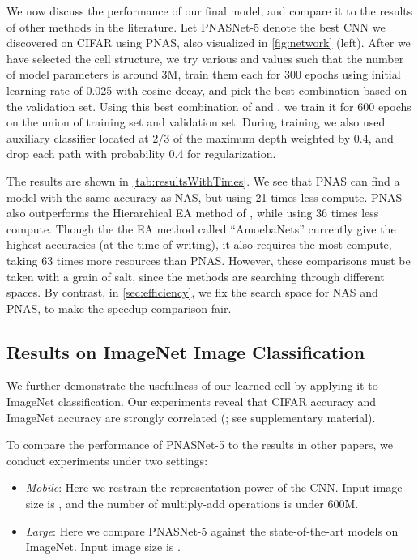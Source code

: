 \documentclass[runningheads]{llncs}
\begin{document}
We now discuss the performance of our final model,
and compare it to the results of other methods in the literature.
Let PNASNet-5 denote the best CNN we discovered on CIFAR using PNAS, also visualized in \cref{fig:network} (left).
After we have selected the cell structure,
we try various  and  values such that the number of model parameters is around 3M,
train them each for 300 epochs using initial learning rate of 0.025 with cosine decay,
and pick the best combination based on the validation set.
Using this best combination of  and , we train it for
600 epochs on the union of training set and validation set.
During training we also used auxiliary classifier located at 2/3 of the maximum depth weighted by 0.4, and drop each path with probability 0.4 for regularization.

The results are shown in \cref{tab:resultsWithTimes}.
We see that PNAS can find a model with the same accuracy as NAS,
but using 21 times less compute.
PNAS also outperforms the Hierarchical EA method of \cite{Liu2017}, while using 36 times less compute.
Though the the EA method called ``AmoebaNets''
\cite{DBLP:journals/corr/abs-1802-01548}
currently give the highest accuracies (at the time of writing),
it also requires the most compute, taking 63 times more resources than PNAS.
However, these comparisons must be taken with a grain of salt, 
since the methods are searching through different spaces.
By contrast, in \cref{sec:efficiency}, we fix the search space for NAS and PNAS,
to make the speedup comparison fair.

 
\subsection{Results on ImageNet Image Classification}
\label{sec:imagenet}

We further demonstrate the usefulness of our learned cell by applying it to ImageNet classification.
Our experiments reveal that CIFAR accuracy and ImageNet accuracy are strongly correlated (; see supplementary material).

To compare the performance of PNASNet-5 
to the results in other papers,
we conduct experiments under two settings:
\begin{itemize}
    \item \textit{Mobile}: Here we restrain the representation power of the CNN.
    Input image size is , and the number of multiply-add operations is under 600M.
    \item \textit{Large}: Here we compare PNASNet-5 against the state-of-the-art models on ImageNet.
    Input image size is .
\end{itemize}
\end{document}
